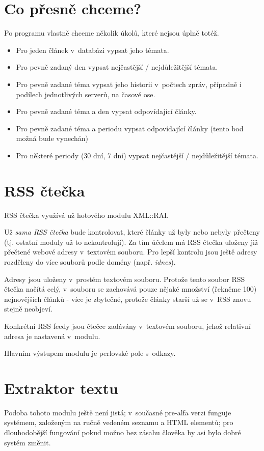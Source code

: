 \documentclass[12pt]{amsart}
\begin{document}
\section{Co přesně chceme?}
\label{cochci}
Po programu vlastně chceme několik úkolů, které nejsou úplně totéž.
\begin{itemize}
    \item Pro jeden článek v~databázi vypsat jeho témata.
    \item Pro pevně zadaný den vypsat nejčastější / nejdůležitější témata.
    \item Pro pevně zadané téma vypsat jeho historii v~počtech zpráv, případně i podílech jednotlivých serverů, na časové ose.
    \item Pro pevně zadané téma a den vypsat odpovídající články.
    \item Pro pevně zadané téma a periodu vypsat odpovídající články (tento bod možná bude vynechán)
    \item Pro některé periody (30 dní, 7 dní) vypsat nejčastější / nejdůležitější témata.
\end{itemize}

\section{RSS čtečka}
RSS čtečka využívá už hotového modulu XML::RAI. 

Už \emph{sama RSS čtečka} bude kontrolovat, které články už byly nebo nebyly přečteny (tj. ostatní moduly už to nekontrolují). Za tím účelem má RSS čtečka uloženy již přečtené webové adresy v~textovém souboru. Pro lepší kontrolu jsou ještě adresy rozděleny do více souborů podle domény (např. \emph{idnes}). 

Adresy jsou uloženy v~prostém textovém souboru. Protože tento soubor RSS čtečka načítá celý, v~souboru se zachovává pouze nějaké množství (řekněme 100) nejnovějších článků - více je zbytečné, protože články starší už se v~RSS znovu stejně neobjeví.

Konkrétní RSS feedy jsou čtečce zadávány v~textovém souboru, jehož relativní adresa je  nastavená v~modulu.

Hlavním výstupem modulu je perlovské pole s~odkazy.

\section{Extraktor textu} 
Podoba tohoto modulu ještě není jistá; v~současné pre-alfa verzi funguje systémem, založeným na ručně vedeném seznamu  a  HTML elementů; pro dlouhodobější fungování pokud možno bez zásahu člověka by asi bylo dobré systém změnit.
\end{document}
